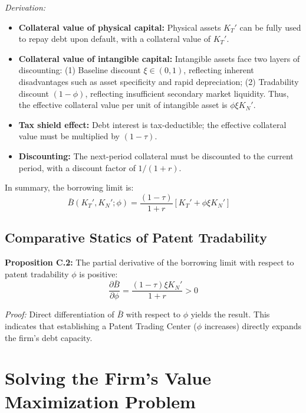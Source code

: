 \documentclass[12pt,a4paper]{article}
\begin{document}
\textit{Derivation:}
\begin{itemize}
    \item \textbf{Collateral value of physical capital:} Physical assets $K_T'$ can be fully used to repay debt upon default, with a collateral value of $K_T'$.
    \item \textbf{Collateral value of intangible capital:} Intangible assets face two layers of discounting: (1) Baseline discount $\xi \in (0,1)$, reflecting inherent disadvantages such as asset specificity and rapid depreciation; (2) Tradability discount $(1-\phi)$, reflecting insufficient secondary market liquidity. Thus, the effective collateral value per unit of intangible asset is $\phi \xi K_N'$.
    \item \textbf{Tax shield effect:} Debt interest is tax-deductible; the effective collateral value must be multiplied by $(1-\tau)$.
    \item \textbf{Discounting:} The next-period collateral must be discounted to the current period, with a discount factor of $1/(1+r)$.
\end{itemize}

In summary, the borrowing limit is:
\begin{equation}
\bar{B}(K_T', K_N'; \phi) = \frac{(1-\tau)}{1+r} [K_T' + \phi \xi K_N'] \quad 
\end{equation}

\subsection{Comparative Statics of Patent Tradability}
\textbf{Proposition C.2:} The partial derivative of the borrowing limit with respect to patent tradability $\phi$ is positive:
\begin{equation}
\frac{\partial \bar{B}}{\partial \phi} = \frac{(1-\tau) \xi K_N'}{1+r} > 0
\end{equation}

\textit{Proof:}
Direct differentiation of $\bar{B}$ with respect to $\phi$ yields the result. This indicates that establishing a Patent Trading Center ($\phi$ increases) directly expands the firm's debt capacity. 

\section{Solving the Firm's Value Maximization Problem}\label{app:D}
\end{document}
